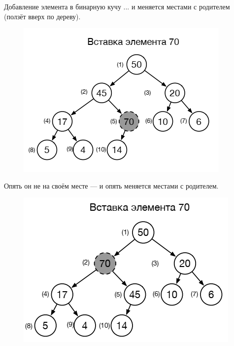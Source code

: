 \documentclass{beamer}
\begin{document}
\begin{frame}{Добавление элемента в бинарную кучу}	
	... и меняется местами с родителем (ползёт вверх по дереву).
	\begin{figure}[h]
		\centering
		\includegraphics[scale=0.4]{images/lec06-pic11.png}
	\end{figure}
	Опять он не на своём месте — и опять меняется местами с родителем.
	\begin{figure}[h]
		\centering
		\includegraphics[scale=0.4]{images/lec06-pic12.png}
	\end{figure}
\end{frame}
\end{document}
